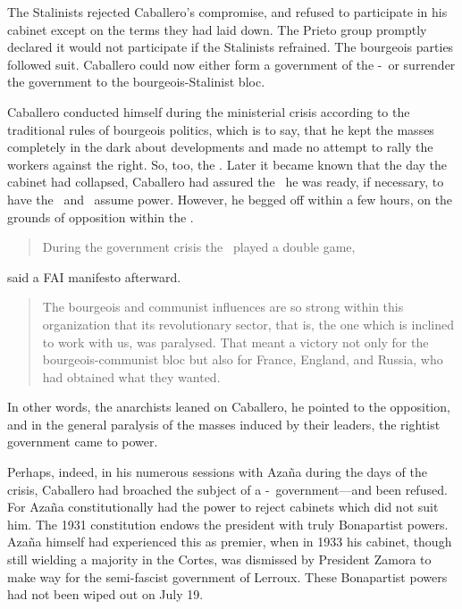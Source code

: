 The Stalinists rejected Caballero’s compromise, and refused to participate in his cabinet except on the terms they had laid down. The Prieto group promptly declared it would not participate if the Stalinists refrained. The bourgeois parties followed suit. Caballero could now either form a government of the \UGT-\CNT\ or surrender the government to the bourgeois-Stalinist bloc.

Caballero conducted himself during the ministerial crisis according to the traditional rules of bourgeois politics, which is to say, that he kept the masses completely in the dark about developments and made no attempt to rally the workers against the right. So, too, the \CNT. Later it became known that the day the cabinet had collapsed, Caballero had assured the \CNT\ he was ready, if necessary, to have the \UGT\ and \CNT\ assume power. However, he begged off within a few hours, on the grounds of opposition within the \UGT.

\begin{quotation}\sloppy
  During the government crisis the \UGT\ played a double game,
\end{quotation}  
said a FAI manifesto afterward.

\begin{quotation}
  \noindent
  The bourgeois and communist influences are so strong within this organization that its revolutionary sector, that is, the one which is inclined to work with us, was paralysed. That meant a victory not only for the bourgeois-communist bloc but also for France, England, and Russia, who had obtained what they wanted.
\end{quotation}

In other words, the anarchists leaned on Caballero, he pointed to the opposition, and in the general paralysis of the masses induced by their leaders, the rightist government came to power.

Perhaps, indeed, in his numerous sessions with Azaña during the days of the crisis, Caballero had broached the subject of a \UGT-\CNT\ government---and been refused. For Azaña constitutionally had the power to reject cabinets which did not suit him. The 1931 constitution endows the president with truly Bonapartist powers. Azaña himself had experienced this as premier, when in 1933 his cabinet, though still wielding a majority in the Cortes, was dismissed by President Zamora to make way for the semi-fascist government of Lerroux. These Bonapartist powers had not been wiped out on July 19.

